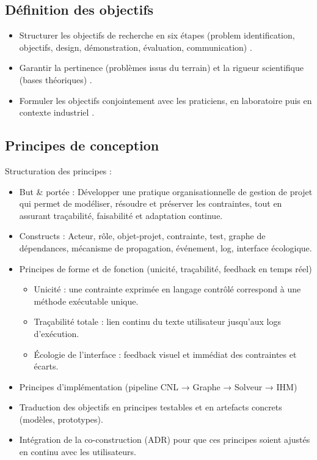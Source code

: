 \documentclass[a4paper,12pt]{article}
\begin{document}
\subsection{Définition des objectifs}
\label{sec:org65ef4e4}
\begin{itemize}
\item Structurer les objectifs de recherche en six étapes (problem identification, objectifs, design, démonstration, évaluation, communication) \autocite[et al. (2007)]{Peffers}.
\item Garantir la pertinence (problèmes issus du terrain) et la rigueur scientifique (bases théoriques) \autocite[et al. (2004)]{Hevner}.
\item Formuler les objectifs conjointement avec les praticiens, en laboratoire puis en contexte industriel \autocite[et al. (2011) (ADR)]{Sein}.
\end{itemize}
\subsection{Principes de conception}
\label{sec:org718c12e}
Structuration des principes \autocite[\& Jones (2007)]{Gregor} :
\begin{itemize}
\item But \& portée : Développer une pratique organisationnelle de gestion de projet qui permet de modéliser, résoudre et préserver les contraintes, tout en assurant traçabilité, faisabilité et adaptation continue.
\item Constructs : Acteur, rôle, objet-projet, contrainte, test, graphe de dépendances, mécanisme de propagation, événement, log, interface écologique.
\item Principes de forme et de fonction (unicité, traçabilité, feedback en temps réel)
\begin{itemize}
\item Unicité : une contrainte exprimée en langage contrôlé correspond à une méthode exécutable unique.
\item Traçabilité totale : lien continu du texte utilisateur jusqu’aux logs d’exécution.
\item Écologie de l’interface : feedback visuel et immédiat des contraintes et écarts.
\end{itemize}
\item Principes d’implémentation (pipeline CNL → Graphe → Solveur → IHM)
\item Traduction des objectifs en principes testables et en artefacts concrets (modèles, prototypes).
\item Intégration de la co-construction (ADR) pour que ces principes soient ajustés en continu avec les utilisateurs.
\end{itemize}
\end{document}
